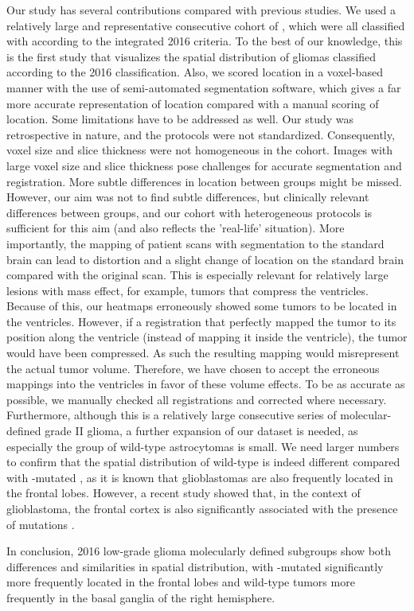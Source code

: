 Our study has several contributions compared with previous studies.
We used a relatively large and representative consecutive cohort of , which were all classified with  according to the integrated  2016 criteria.
To the best of our knowledge, this is the first study that visualizes the spatial distribution of gliomas classified according to the  2016 classification.
Also, we scored location in a voxel-based manner with the use of semi-automated segmentation software, which gives a far more accurate representation of location compared with a manual scoring of location.
Some limitations have to be addressed as well.
Our study was retrospective in nature, and the  protocols were not standardized.
Consequently, voxel size and slice thickness were not homogeneous in the cohort.
Images with large voxel size and slice thickness pose challenges for accurate segmentation and registration.
More subtle differences in location between groups might be missed.
However, our aim was not to find subtle differences, but clinically relevant differences between groups, and our cohort with heterogeneous  protocols is sufficient for this aim (and also reflects the 'real-life' situation).
More importantly, the mapping of patient  scans with segmentation to the  standard brain can lead to distortion and a slight change of location on the standard brain compared with the original  scan.
This is especially relevant for relatively large lesions with mass effect, for example, tumors that compress the ventricles.
Because of this, our heatmaps erroneously showed some tumors to be located in the ventricles.
However, if a registration that perfectly mapped the tumor to its position along the ventricle (instead of mapping it inside the ventricle), the tumor would have been compressed.
As such the resulting mapping would misrepresent the actual tumor volume.
Therefore, we have chosen to accept the erroneous mappings into the ventricles in favor of these volume effects.
To be as accurate as possible, we manually checked all registrations and corrected where necessary.
Furthermore, although this is a relatively large consecutive series of molecular-defined grade II glioma, a further expansion of our dataset is needed, as especially the group of  wild-type astrocytomas is small.
We need larger numbers to confirm that the spatial distribution of  wild-type  is indeed different compared with -mutated , as it is known that glioblastomas are also frequently located in the frontal lobes.
However, a recent study showed that, in the context of glioblastoma, the frontal cortex is also significantly associated with the presence of  mutations \autocite{tejada2018voxel}.

In conclusion,  2016 low-grade glioma molecularly defined subgroups show both differences and similarities in spatial distribution, with -mutated  significantly more frequently located in the frontal lobes and  wild-type tumors more frequently in the basal ganglia of the right hemisphere.
